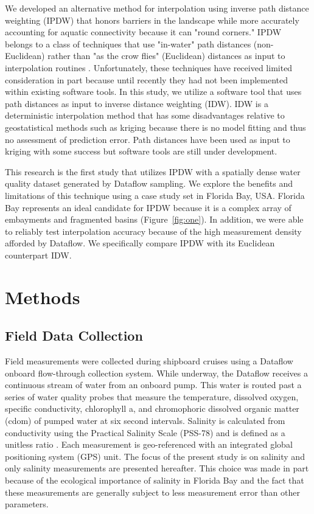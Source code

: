 \documentclass[shortnames,nofooter,noheadings]{jss}
\begin{document}
  We developed an alternative method for interpolation using inverse path distance weighting (IPDW) that honors barriers in the landscape while more accurately accounting for aquatic connectivity because it can "round corners." IPDW belongs to a class of techniques that use "in-water" path distances (non-Euclidean) rather than "as the crow flies" (Euclidean) distances as input to interpolation routines \citep{little1997kriging}. Unfortunately, these techniques have received limited consideration in part because until recently they had not been implemented within existing software tools. In this study, we utilize a software tool that uses path distances as input to inverse distance weighting (IDW). IDW is a deterministic interpolation method that has some disadvantages relative to geostatistical methods such as kriging because there is no model fitting and thus no assessment of prediction error. Path distances have been used as input to kriging with some success \citep{krivoruchko2004geostatistical,lopez2009geostatistical} but software tools are still under development. 

  This research is the first study that utilizes IPDW with a spatially dense water quality dataset generated by Dataflow sampling. We explore the benefits and limitations of this technique using a case study set in Florida Bay, USA. Florida Bay represents an ideal candidate for IPDW because it is a complex array of embayments and fragmented basins (Figure~\ref{fig:one}). In addition, we were able to reliably test interpolation accuracy because of the high measurement density afforded by Dataflow. We specifically compare IPDW with its Euclidean counterpart IDW.
\section[Methods]{Methods}

\noindent \subsection[Field Data Collection]{Field Data Collection}
\noindent Field measurements were collected during shipboard cruises using a Dataflow onboard flow-through collection system. While underway, the Dataflow receives a continuous stream of water from an onboard pump. This water is routed past a series of water quality probes that measure the temperature, dissolved oxygen, specific conductivity, chlorophyll a, and chromophoric dissolved organic matter (cdom) of pumped water at six second intervals. Salinity is calculated from conductivity using the Practical Salinity Scale (PSS-78) and is defined as a unitless ratio \citep{iociapso}. Each measurement is geo-referenced with an integrated global positioning system (GPS) unit. The focus of the present study is on salinity and only salinity measurements are presented hereafter. This choice was made in part because of the ecological importance of salinity in Florida Bay and the fact that these measurements are generally subject to less measurement error than other parameters.
\end{document}
